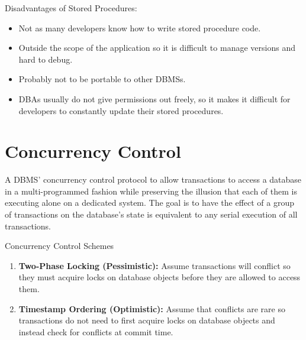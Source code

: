 \documentclass[11pt]{article}
\begin{document}
Disadvantages of Stored Procedures:
\begin{itemize}
    \item
    Not as many developers know how to write stored procedure code.
    
    \item
    Outside the scope of the application so it is difficult to manage versions and hard to 
    debug.
    
    \item
    Probably not to be portable to other DBMSs.
    
    \item
    DBAs usually do not give permissions out freely, so it makes it difficult for developers to 
    constantly update their stored procedures.
\end{itemize}

\section{Concurrency Control}
A DBMS' concurrency control protocol to allow transactions to access a database in a 
multi-programmed 
fashion while preserving the illusion that each of them is executing alone on a dedicated system.
The goal is to have the effect of a group of transactions on the database's state is equivalent to 
any 
serial execution of all transactions.
    
Concurrency Control Schemes
\begin{enumerate}
    \item \textbf{Two-Phase Locking (Pessimistic):}
    Assume transactions will conflict so they must acquire locks on database objects before they 
are 
    allowed to access them.
    
    \item \textbf{Timestamp Ordering (Optimistic):}
    Assume that conflicts are rare so transactions do not need to first acquire locks on database 
objects 
    and instead check for conflicts at commit time.
\end{enumerate}

%     
\end{document}
